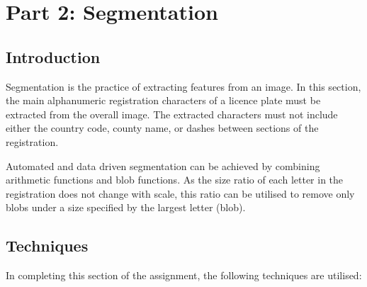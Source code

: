 \documentclass[a4paper]{article}
\begin{document}
	\section{Part 2: Segmentation}
	\subsection{Introduction}
	Segmentation is the practice of extracting features from an image. In
	this section, the main alphanumeric registration characters of a licence
	plate must be extracted from the overall image. The extracted characters
	must not include either the country code, county name, or dashes between
	sections of the registration.
	\par Automated and data driven segmentation can be achieved by combining
	arithmetic functions and blob functions. As the size ratio of each letter in
	the registration does not change with scale, this ratio can be utilised
	to remove only blobs under a size specified by the largest letter
	(blob).
	\subsection{Techniques}
	In completing this section of the assignment, the following techniques
	are utilised:
\end{document}
